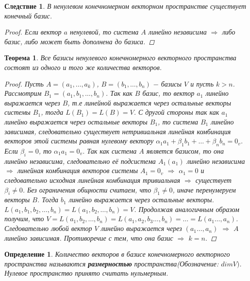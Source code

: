 \documentclass[main.tex]{subfiles}
\begin{document}
\newtheorem*{result}{Следствие}
\begin{result}
В ненулевом конечномерном векторном пространстве существует конечный базис.
\begin{proof}
Если вектор $a$ ненулевой, то система $A$ линейно независима $\Rightarrow$ либо базис, либо может быть дополнена до базиса.
\end{proof}
\end{result}


\newtheorem*{t2}{Теорема}
\begin{t2}
Все базисы ненулевого конечномерного векторного пространства состоят из одного и того же количества векторов.
\begin{proof}
Пусть $A = (a_{1},\dots,a_{k})$, $B = (b_{1},\dots,b_{n})$ $-$ базисы $V$ и пусть $k>n$.
Рассмотрим $B_{1} = (a_{1}, b_{1},\dots,b_{n})$. Так как $B$ базис, то вектор $a_{1}$ линейно выражается через $B$, т.е линейной выражается через остальные векторы системы $B_{1}$, тогда $L(B_{1}) = L(B) = V$. С другой стороны так как $a_{1}$ линейно выражается через остальные векторы $B_{1}$, то система $B_{1}$ линейно зависимая, следовательно существует нетривиальная линейная комбинация векторов этой системы равная нулевому вектору 
$\alpha_{1}a_{1} + \beta_{1}b_{1} + \dots + \beta_{n}b_{n} = 0_{v}$. Если $\beta_{i} = 0$, то $\alpha_{1}a_{1} = 0_{v}$. Так как система $A$ является базисом, то она линейно независима, следовательно её подсистема $A_{1}(a_{1})$ линейно независима $\Rightarrow$ линейная комбинация векторов системы $A_{1} = 0_{v}$ $\Rightarrow$ $\alpha_{1} = 0$ и следовательно исходная линейная комбинация тривиальная $\Rightarrow$ существует $\beta_{i} \neq 0$. Без ограничения общности считаем, что $\beta_{1} \neq 0$, иначе перенумеруем векторы $B$. Тогда $b_{1}$ линейно выражается через остальные векторы. $L(a_{1}, b_{1}, b_{2}, \dots, b_{n}) = L(a_{1}, b_{2}, \dots, b_{n}) = V$. Продолжая аналогичным образом получим, что $V = L(a_{1}, b_{2}, \dots, b_{n}) = L(a_{1}, a_{2}, b_{3}\dots,b_{n}) = \dots = L(a_{1}\dots,a_{n})$. Следовательно любой вектор $V$ линейно выражается через $(a_{1}\dots,a_{n})$ $\Rightarrow$ $A$ линейно зависимая. Противоречие с тем, что она базис $\Rightarrow$ $k = n$.
\end{proof}
\end{t2}


\newtheorem*{Definition4}{Определение}
\begin{Definition4}
Количество векторов в базисе конечномерного векторного пространства называются \textbf{размерностью} пространства(Обозначение: $dimV)$. Нулевое пространство принято считать нульмерным.
\end{Definition4}
\end{document}
